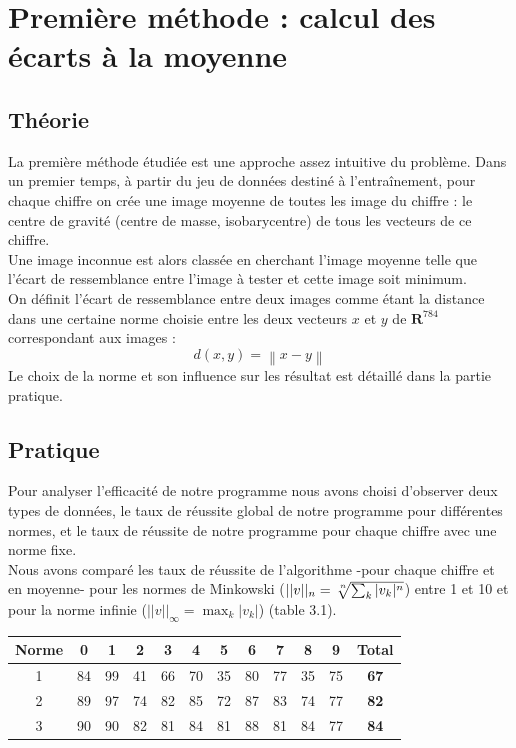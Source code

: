 \documentclass[a4paper,11pt,twoside]{report}
\newcommand{\norm}[1]{\left\lVert#1\right\rVert} %
\begin{document}
\chapter{Première méthode : calcul des écarts à la moyenne} 
\section{Théorie}
La première méthode étudiée est une approche assez intuitive du problème.
Dans un premier temps, à partir du jeu de données destiné à l'entraînement, pour chaque chiffre on crée une image moyenne de toutes les image du chiffre : le centre de gravité (centre de masse, isobarycentre) de tous les vecteurs de ce chiffre.\\Une image inconnue est alors classée en cherchant l'image moyenne telle que l'écart de ressemblance entre l'image à tester et cette image soit minimum.\\

On définit l'écart de ressemblance entre deux images comme étant la distance dans une certaine norme choisie entre les deux vecteurs $x$ et $y$ de $\textbf{R}^{784}$ correspondant aux images : $$d(x,y) = \norm{x-y}$$ Le choix de la norme et son influence sur les résultat est détaillé dans la partie pratique.

\section{Pratique}
Pour analyser l'efficacité de notre programme nous avons choisi d'observer deux types de données, le taux de réussite global de notre programme pour différentes normes, et le taux de réussite de notre programme pour chaque chiffre avec une norme fixe.
\\
Nous avons comparé les taux de réussite de l'algorithme -pour chaque chiffre et en moyenne- pour les normes de Minkowski ($||v||_{n} = \sqrt[\leftroot{-2}\uproot{2} n]{\sum_{k}^{} |v_{k}|^n}$) entre 1 et 10 et pour la norme infinie ($||v||_{\infty} = \displaystyle \max_{k}|v_{k}|$) (table 3.1).

\begin{center}
\begin{tabular}{ |c||c|c|c|c|c|c|c|c|c|c|c| } 
\hline
 Norme & 0 & 1 & 2 & 3 & 4 & 5 & 6 & 7 & 8 & 9 & \textbf{Total} \\ 
  \hline
  \hline
 1 & 84 & 99 & 41 & 66 & 70 & 35 & 80 & 77 & 35 & 75 & \textbf{67}\\
 \hline
 2 & 89 & 97 & 74 & 82 & 85 & 72 & 87 & 83 & 74 & 77 & \textbf{82}\\
 \hline
 3 & 90 & 90 & 82 & 81 & 84 & 81 & 88 & 81 & 84 & 77 & \textbf{84}\\
 \hline
\end{tabular}
\end{center}
\end{document}
